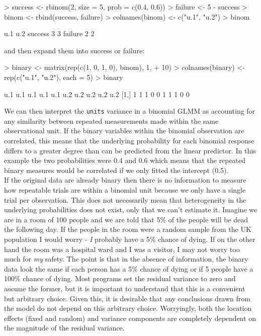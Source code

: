 \documentclass{article}
\begin{document}
\begin{Schunk}
\begin{Sinput}
> success <- rbinom(2, size = 5, prob = c(0.4, 0.6))
> failure <- 5 - success
> binom <- rbind(success, failure)
> colnames(binom) <- c("u.1", "u.2")
> binom
\end{Sinput}
\begin{Soutput}
        u.1 u.2
success   3   3
failure   2   2
\end{Soutput}
\end{Schunk}

and then expand them into success or failure:

\begin{Schunk}
\begin{Sinput}
> binary <- matrix(rep(c(1, 0, 1, 0), binom), 1, 
+     10)
> colnames(binary) <- rep(c("u.1", "u.2"), each = 5)
> binary
\end{Sinput}
\begin{Soutput}
     u.1 u.1 u.1 u.1 u.1 u.2 u.2 u.2 u.2 u.2
[1,]   1   1   1   0   0   1   1   1   0   0
\end{Soutput}
\end{Schunk}

We can then interpret the \texttt{units} variance in a binomial GLMM as accounting for any similarity between repeated measurements made within the same observational unit. If the binary variables within the binomial observation are correlated, this means that the underlying probability for each binomial response differs to a greater degree than can be predicted from the linear predictor. In this example the two probabilities were 0.4 and 0.6 which means that the repeated binary measures would be correlated if we only fitted the intercept (0.5).\\  

If the original data are already binary then there is no information to measure how repeatable trials are within a binomial unit because we only have a single trial per observation. This does not necessarily mean that heterogeneity in the underlying probabilities does not exist, only that we can't estimate it. Imagine we are in a room of 100 people and we are told that 5\% of the people will be dead the following day.  If the people in the room were a random sample from the UK population I would worry - \emph{I} probably have a 5\% chance of dying. If on the other hand the room was a hospital ward and I was a visitor, I may not worry too much for \emph{my} safety. The point is that in the absence of information, the binary data look the same if each person has a 5\% chance of dying or if 5 people have a 100\% chance of dying.  Most programs set the residual variance to zero and assume the former, but it is important to understand that this is a convenient but arbitrary choice. Given this, it is desirable that any conclusions drawn from the model do not depend on this arbitrary choice. Worryingly, both the location effects (fixed and random) and variance components are completely dependent on the magnitude of the residual variance.\\
\end{document}
